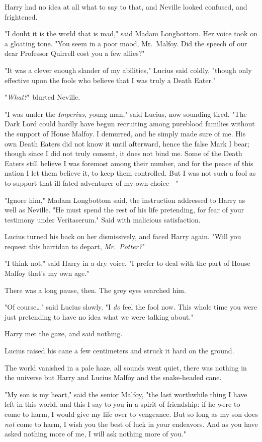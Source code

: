 Harry had no idea at all what to say to that, and Neville looked confused, and 
frightened.

"I doubt it is the world that is mad," said Madam Longbottom. Her voice took on 
a gloating tone. "You seem in a poor mood, Mr.~Malfoy. Did the speech of our 
dear Professor Quirrell cost you a few allies?"

"It was a clever enough slander of my abilities," Lucius said coldly, "though 
only effective upon the fools who believe that I was truly a Death Eater."

"\emph{What?}" blurted Neville.

"I was under the \emph{Imperius,} young man," said Lucius, now sounding tired. 
"The Dark Lord could hardly have begun recruiting among pureblood families 
without the support of House Malfoy. I demurred, and he simply made sure of me. 
His own Death Eaters did not know it until afterward, hence the false Mark I 
bear; though since I did not truly consent, it does not bind me. Some of the 
Death Eaters still believe I was foremost among their number, and for the peace 
of this nation I let them believe it, to keep them controlled. But I was not 
such a fool as to support that ill-fated adventurer of my own choice---"

"Ignore him," Madam Longbottom said, the instruction addressed to Harry as well 
as Neville. "He must spend the rest of his life pretending, for fear of your 
testimony under Veritaserum." Said with malicious satisfaction.

Lucius turned his back on her dismissively, and faced Harry again. "Will you 
request this harridan to depart, \emph{Mr.~Potter?}"

"I think not," said Harry in a dry voice. "I prefer to deal with the part of 
House Malfoy that's my own age."

There was a long pause, then. The grey eyes searched him.

"Of course{\ldots}" said Lucius slowly. "I \emph{do} feel the fool now. This 
whole time you were just pretending to have no idea what we were talking about."

Harry met the gaze, and said nothing.

Lucius raised his cane a few centimeters and struck it hard on the ground.

The world vanished in a pale haze, all sounds went quiet, there was nothing in 
the universe but Harry and Lucius Malfoy and the snake-headed cane.

"My son is my heart," said the senior Malfoy, "the last worthwhile thing I have 
left in this world, and this I say to you in a spirit of friendship: if he were 
to come to harm, I would give my life over to vengeance. But so long as my son 
does \emph{not} come to harm, I wish you the best of luck in your endeavors. 
And as you have asked nothing more of me, I will ask nothing more of you."

